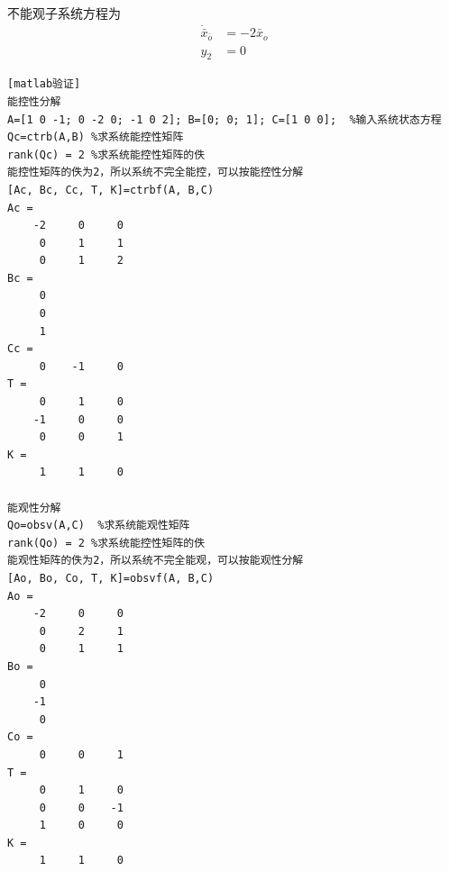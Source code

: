 \documentclass[a4paper]{article}
\begin{document}
不能观子系统方程为\\
\begin{align*}
\dot{\bar{x}}_{\bar{o}} &= -2\bar{x}_o \\
y_2 &= 0
\end{align*}
\begin{verbatim}[matlab验证]
能控性分解
A=[1 0 -1; 0 -2 0; -1 0 2]; B=[0; 0; 1]; C=[1 0 0];  %输入系统状态方程
Qc=ctrb(A,B) %求系统能控性矩阵
rank(Qc) = 2 %求系统能控性矩阵的佚  
能控性矩阵的佚为2，所以系统不完全能控，可以按能控性分解
[Ac, Bc, Cc, T, K]=ctrbf(A, B,C)
Ac =
    -2     0     0
     0     1     1
     0     1     2
Bc =
     0
     0
     1
Cc =
     0    -1     0
T =
     0     1     0
    -1     0     0
     0     0     1
K =
     1     1     0

能观性分解
Qo=obsv(A,C)  %求系统能观性矩阵   
rank(Qo) = 2 %求系统能控性矩阵的佚
能观性矩阵的佚为2，所以系统不完全能观，可以按能观性分解
[Ao, Bo, Co, T, K]=obsvf(A, B,C)
Ao =
    -2     0     0
     0     2     1
     0     1     1
Bo =
     0
    -1
     0
Co =
     0     0     1
T =
     0     1     0
     0     0    -1
     1     0     0
K =
     1     1     0     
\end{verbatim}
\end{document}
